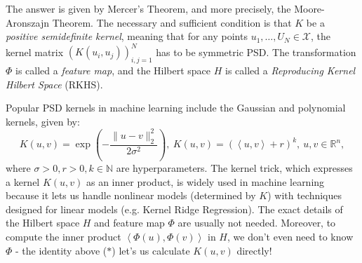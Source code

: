The answer is given by Mercer's Theorem, and more precisely, the Moore-Aronszajn Theorem. The necessary 
and sufficient condition is that $K$ be a \textit{positive semidefinite kernel}, meaning that for any points 
$u_1, \dots, U_N \in \mathcal{X}$, the kernel matrix $(K(u_i, u_j))_{i, j = 1}^N$ has to be symmetric PSD. 
The transformation $\Phi$ is called a \textit{feature map}, and the Hilbert space $H$ is called a 
\textit{Reproducing Kernel Hilbert Space} (RKHS). 

Popular PSD kernels in machine learning include the Gaussian and polynomial kernels, given by:
\[ K(u, v) = \exp{\left( -\frac{\lVert u - v \rVert_{2}^2}{2 \sigma^2} \right)}, \ 
K(u, v) = (\left\langle u, v \right\rangle + r)^k, \ u, v \in \mathbb{R}^n, \]
where $\sigma > 0, r > 0, k \in \mathbb{N}$ are hyperparameters. The kernel trick, which expresses a kernel 
$K(u, v)$ as an inner product, is widely used in machine learning because it lets us handle nonlinear models 
(determined by $K$) with techniques designed for linear models (e.g. Kernel Ridge Regression). The exact 
details of the Hilbert space $H$ and feature map $\Phi$ are usually not needed. Moreover, to compute the inner 
product $\left\langle \Phi(u), \Phi(v) \right\rangle$ in $H$, we don't even need to know $\Phi$ - the identity 
above ($*$) let's us calculate $K(u, v)$ directly!
